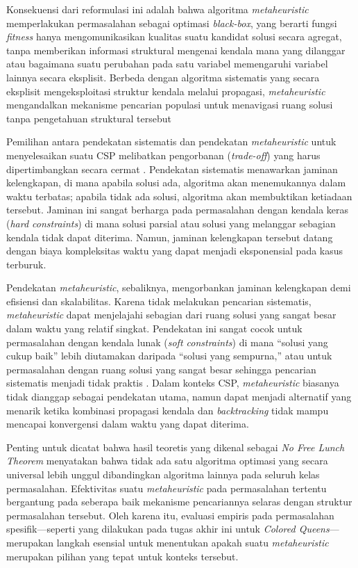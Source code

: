 Konsekuensi dari reformulasi ini adalah bahwa algoritma \textit{metaheuristic} memperlakukan permasalahan sebagai optimasi \textit{black-box}, yang berarti fungsi \textit{fitness} hanya mengomunikasikan kualitas suatu kandidat solusi secara agregat, tanpa memberikan informasi struktural mengenai kendala mana yang dilanggar atau bagaimana suatu perubahan pada satu variabel memengaruhi variabel lainnya secara eksplisit. Berbeda dengan algoritma sistematis yang secara eksplisit mengeksploitasi struktur kendala melalui propagasi, \textit{metaheuristic} mengandalkan mekanisme pencarian populasi untuk menavigasi ruang solusi tanpa pengetahuan struktural tersebut \cite{hoos2006local}

Pemilihan antara pendekatan sistematis dan pendekatan \textit{metaheuristic} untuk menyelesaikan suatu CSP melibatkan pengorbanan (\textit{trade-off}) yang harus dipertimbangkan secara cermat \cite{michalewicz2000solve}. Pendekatan sistematis menawarkan jaminan kelengkapan, di mana apabila solusi ada, algoritma akan menemukannya dalam waktu terbatas; apabila tidak ada solusi, algoritma akan membuktikan ketiadaan tersebut. Jaminan ini sangat berharga pada permasalahan dengan kendala keras (\textit{hard constraints}) di mana solusi parsial atau solusi yang melanggar sebagian kendala tidak dapat diterima. Namun, jaminan kelengkapan tersebut datang dengan biaya kompleksitas waktu yang dapat menjadi eksponensial pada kasus terburuk.

Pendekatan \textit{metaheuristic}, sebaliknya, mengorbankan jaminan kelengkapan demi efisiensi dan skalabilitas. Karena tidak melakukan pencarian sistematis, \textit{metaheuristic} dapat menjelajahi sebagian dari ruang solusi yang sangat besar dalam waktu yang relatif singkat. Pendekatan ini sangat cocok untuk permasalahan dengan kendala lunak (\textit{soft constraints}) di mana ``solusi yang cukup baik'' lebih diutamakan daripada ``solusi yang sempurna,'' atau untuk permasalahan dengan ruang solusi yang sangat besar sehingga pencarian sistematis menjadi tidak praktis \cite{blum2003metaheuristics}. Dalam konteks CSP, \textit{metaheuristic} biasanya tidak dianggap sebagai pendekatan utama, namun dapat menjadi alternatif yang menarik ketika kombinasi propagasi kendala dan \textit{backtracking} tidak mampu mencapai konvergensi dalam waktu yang dapat diterima.

Penting untuk dicatat bahwa hasil teoretis yang dikenal sebagai \textit{No Free Lunch Theorem} \cite{michalewicz2000solve} menyatakan bahwa tidak ada satu algoritma optimasi yang secara universal lebih unggul dibandingkan algoritma lainnya pada seluruh kelas permasalahan. Efektivitas suatu \textit{metaheuristic} pada permasalahan tertentu bergantung pada seberapa baik mekanisme pencariannya selaras dengan struktur permasalahan tersebut. Oleh karena itu, evaluasi empiris pada permasalahan spesifik—seperti yang dilakukan pada tugas akhir ini untuk \textit{Colored Queens}—merupakan langkah esensial untuk menentukan apakah suatu \textit{metaheuristic} merupakan pilihan yang tepat untuk konteks tersebut.

